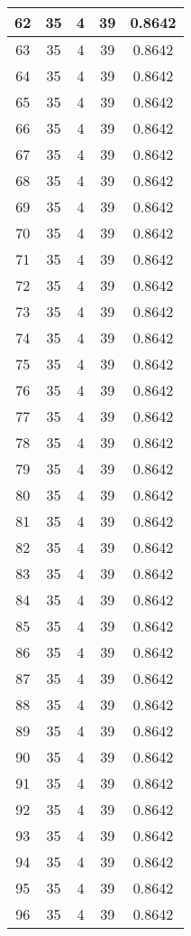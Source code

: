 \documentclass[letterpaper, 12pt]{article}
\begin{document}
\begin{longtable}{|c|c|c|c|c|}
\hline
62 & 35 & 4 & 39 & 0.8642 \\
\hline
63 & 35 & 4 & 39 & 0.8642 \\
\hline
64 & 35 & 4 & 39 & 0.8642 \\
\hline
65 & 35 & 4 & 39 & 0.8642 \\
\hline
66 & 35 & 4 & 39 & 0.8642 \\
\hline
67 & 35 & 4 & 39 & 0.8642 \\
\hline
68 & 35 & 4 & 39 & 0.8642 \\
\hline
69 & 35 & 4 & 39 & 0.8642 \\
\hline
70 & 35 & 4 & 39 & 0.8642 \\
\hline
71 & 35 & 4 & 39 & 0.8642 \\
\hline
72 & 35 & 4 & 39 & 0.8642 \\
\hline
73 & 35 & 4 & 39 & 0.8642 \\
\hline
74 & 35 & 4 & 39 & 0.8642 \\
\hline
75 & 35 & 4 & 39 & 0.8642 \\
\hline
76 & 35 & 4 & 39 & 0.8642 \\
\hline
77 & 35 & 4 & 39 & 0.8642 \\
\hline
78 & 35 & 4 & 39 & 0.8642 \\
\hline
79 & 35 & 4 & 39 & 0.8642 \\
\hline
80 & 35 & 4 & 39 & 0.8642 \\
\hline
81 & 35 & 4 & 39 & 0.8642 \\
\hline
82 & 35 & 4 & 39 & 0.8642 \\
\hline
83 & 35 & 4 & 39 & 0.8642 \\
\hline
84 & 35 & 4 & 39 & 0.8642 \\
\hline
85 & 35 & 4 & 39 & 0.8642 \\
\hline
86 & 35 & 4 & 39 & 0.8642 \\
\hline
87 & 35 & 4 & 39 & 0.8642 \\
\hline
88 & 35 & 4 & 39 & 0.8642 \\
\hline
89 & 35 & 4 & 39 & 0.8642 \\
\hline
90 & 35 & 4 & 39 & 0.8642 \\
\hline
91 & 35 & 4 & 39 & 0.8642 \\
\hline
92 & 35 & 4 & 39 & 0.8642 \\
\hline
93 & 35 & 4 & 39 & 0.8642 \\
\hline
94 & 35 & 4 & 39 & 0.8642 \\
\hline
95 & 35 & 4 & 39 & 0.8642 \\
\hline
96 & 35 & 4 & 39 & 0.8642 \\

\end{longtable}
\end{document}
